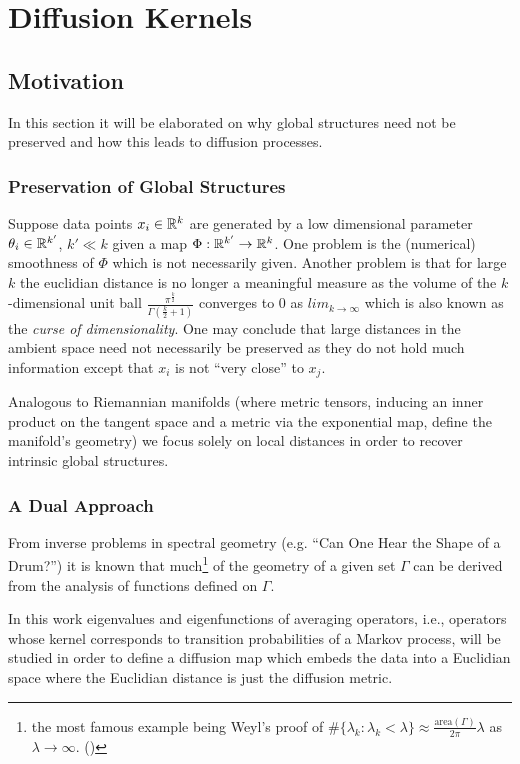 \section{Diffusion Kernels}
\subsection{Motivation}
In this section it will be elaborated on why global structures need not be preserved and how this leads to diffusion processes.
\subsubsection{Preservation of Global Structures}
Suppose data points $x_i \in \mathbb{R}^k$ are generated by a low dimensional parameter $\theta_i \in \mathbb{R}^{k'}$, $k' \ll k$ given a map $\Phi: \mathbb{R}^{k'} \rightarrow \mathbb{R}^k$. One problem is the (numerical) smoothness of $\Phi$ which is not necessarily given.
Another problem is that for large $k$ the euclidian distance is no longer a meaningful measure as the volume of the $k$-dimensional unit ball $\frac{\pi^\frac{k}{2}}{\Gamma(\frac{k}{2}+1)}$ converges to $0$ as $lim_{k\rightarrow\infty}$ which is also known as the \textit{curse of dimensionality}. One may conclude that large distances in the ambient space need not necessarily be preserved as they do not hold much information except that $x_i$ is not ``very close'' to $x_j$.

Analogous to Riemannian manifolds (where metric tensors, inducing an inner product on the tangent space and a metric via the exponential map, define the manifold's geometry) we focus solely on local distances in order to recover intrinsic global structures.

\subsubsection{A Dual Approach}
From inverse problems in spectral geometry (e.g. ``Can One Hear the Shape of a Drum?'') it is known that much\footnote{the most famous example being Weyl's proof of $\#\{\lambda_k : \lambda_k < \lambda\} \approx \frac{\text{area}(\Gamma)}{2\pi}\lambda$ as $\lambda \rightarrow \infty$. (\cite{AnalysisOnManifolds})} of the geometry of a given set $\Gamma$ can be derived from the analysis of functions defined on $\Gamma$.

In this work eigenvalues and eigenfunctions of averaging operators, i.e., operators whose kernel corresponds to transition probabilities of a Markov process, will be studied in order to define a diffusion map which embeds the data into a Euclidian space where the Euclidian distance is just the diffusion metric.

